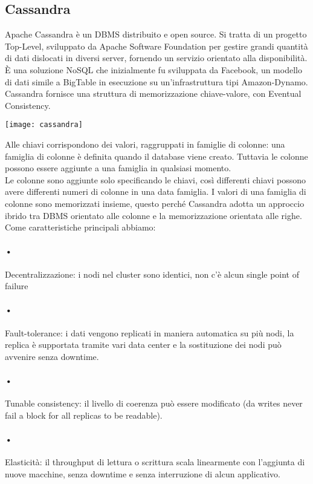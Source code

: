 \subsection{Cassandra}
Apache Cassandra è un DBMS distribuito e open source. Si tratta di un progetto Top-Level, sviluppato da Apache Software Foundation per gestire grandi quantità di dati dislocati in diversi server, fornendo un servizio orientato alla disponibilità.
\\È una soluzione NoSQL che inizialmente fu sviluppata da Facebook, un modello di dati simile a BigTable in esecuzione su un'infrastruttura tipi Amazon-Dynamo. Cassandra fornisce una struttura di memorizzazione chiave-valore, con Eventual Consistency.
\begin{center}
\texttt{[image: cassandra]}
\end{center}
Alle chiavi corrispondono dei valori, raggruppati in famiglie di colonne: una famiglia di colonne è definita quando il database viene creato. Tuttavia le colonne possono essere aggiunte a una famiglia in qualsiasi momento.
\\Le colonne sono aggiunte solo specificando le chiavi, così differenti chiavi possono avere differenti numeri di colonne in una data famiglia. I valori di una famiglia di colonne sono memorizzati insieme, questo perché Cassandra adotta un approccio ibrido tra DBMS orientato alle colonne e la memorizzazione orientata alle righe.
\\Come caratteristiche principali abbiamo:
\paragraph{•} Decentralizzazione: i nodi nel cluster sono identici, non c'è alcun single point of failure
\paragraph{•} Fault-tolerance: i dati vengono replicati in maniera automatica su più nodi, la replica è supportata tramite vari data center e la sostituzione dei nodi può avvenire senza downtime.
\paragraph{•} Tunable consistency: il livello di coerenza può essere modificato (da writes never fail a block for all replicas to be readable).
\paragraph{•} Elasticità: il throughput di lettura o scrittura scala linearmente con l'aggiunta di nuove macchine, senza downtime e senza interruzione di alcun applicativo.

